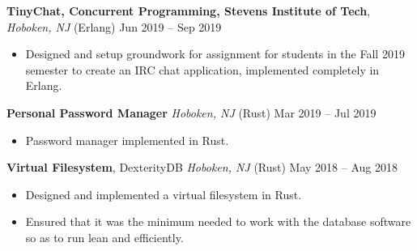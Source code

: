 \documentclass[10pt,letterpaper,roman]{moderncv}
\begin{document}
\hfill

\textbf{TinyChat, Concurrent Programming, Stevens Institute of Tech}, \textit{Hoboken, NJ} (Erlang) \hfill Jun 2019 -- Sep 2019
\begin{itemize}
\item Designed and setup groundwork for assignment for students in the Fall 2019 semester to create an IRC chat application, implemented completely in Erlang.
\end{itemize}

\hfill

\textbf{Personal Password Manager} \textit{Hoboken, NJ} (Rust) \hfill Mar 2019 -- Jul 2019
\begin{itemize}
\item Password manager implemented in Rust.
\end{itemize}

\hfill

\textbf{Virtual Filesystem}, DexterityDB \textit{Hoboken, NJ} (Rust) \hfill May 2018 -- Aug 2018
\begin{itemize}
\item Designed and implemented a virtual filesystem in Rust.
\item Ensured that it was the minimum needed to work with the database software so as to run lean and efficiently.
\end{itemize}
\end{document}

